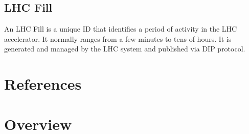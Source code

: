 \subsection{LHC Fill}
An LHC Fill is a unique ID that identifies a period of activity in the LHC accelerator. It normally ranges from a few minutes to tens of hours. It is generated and managed by the LHC system and published via DIP protocol. 


\section{References}

\section{Overview}
